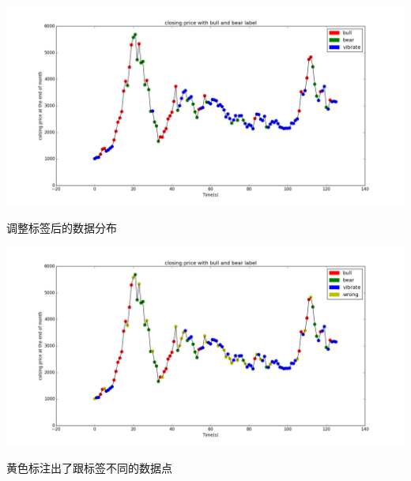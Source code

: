 \documentclass[10pt,a4paper]{article}
\begin{document}
\begin{center}
	\includegraphics[width=1\textwidth]{第五次调整.png}
	\caption{调整标签后的数据分布}
\end{center}\begin{center}
\includegraphics[width=1\textwidth]{第五次调整误差.png}
\caption{黄色标注出了跟标签不同的数据点}
\end{center}
\end{document}
